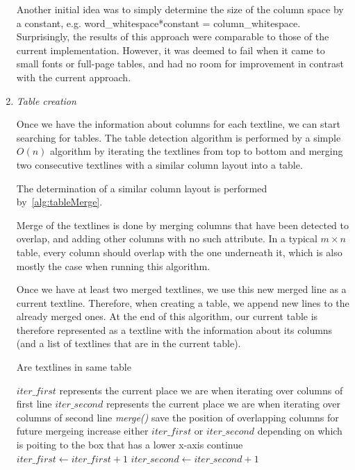 \begin{enumerate}
Another initial idea was to simply determine the size of the column space by a constant, e.g. word\_whitespace*constant = column\_whitespace. Surprisingly, the results of this approach were comparable to those of the current implementation. However, it was deemed to fail when it came to small fonts or full-page tables, and had no room for improvement in contrast with the current approach.

\item \emph{Table creation}

Once we have the information about columns for each textline, we can start searching for tables. The table detection algorithm is performed by a simple $O(n)$ algorithm by iterating the textlines from top to bottom and merging two consecutive textlines with a similar column layout into a table.

The determination of a similar column layout is performed by~\cref{alg:tableMerge}. 

Merge of the textlines is done by merging columns that have been detected to overlap, and adding other columns with no such attribute. In a typical $m{\times}n$ table, every column should overlap with the one underneath it, which is also mostly the case when running this algorithm.

Once we have at least two merged textlines, we use this new merged line as a current textline. Therefore, when creating a table, we append new lines to the already merged ones. At the end of this algorithm, our current table is therefore represented as a textline with the information about its columns (and a list of textlines that are in the current table).

\begin{algorithm}[t]
\caption{Are textlines in same table}
\label{alg:tableMerge}
\begin{algorithmic}
\State $iter\_first$ represents the current place we are when iterating over columns of first line
\State $iter\_second$ represents the current place we are when iterating over columns of second line
\State \emph{merge()}
\EndIf
\EndIf
{} 
\State save the position of overlapping columns for future mergeing
\EndIf
\Else 
\State increase either $iter\_first$ or $iter\_second$ depending on which is poiting to the box that has a lower x-axis
\State continue
\EndIf
\State $iter\_first \gets iter\_first+1$
\State $iter\_second \gets iter\_second+1$
\EndWhile
\end{algorithmic}
\end{algorithm}


\end{enumerate}
